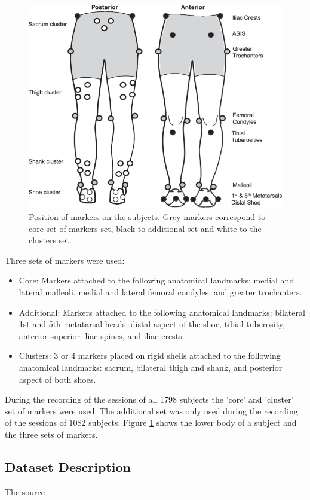 \begin{figure}[ht]
    \begin{centering}
    \includegraphics[width=0.5\columnwidth]{images/billateral_marker_position.png}
    \par\end{centering}
    \caption{Position of markers on the subjects. Grey markers correspond to core set of markers set, black to additional set and white to the clusters set.}
    \label{fig:marker_position}
\end{figure}

Three sets of markers were used:
\begin{itemize}
    \item Core: Markers attached to the following anatomical landmarks: medial and lateral malleoli, medial and lateral femoral condyles, and greater trochanters.
    \item Additional: Markers attached to the following anatomical landmarks: bilateral 1st and 5th metatarsal heads, distal aspect of the shoe, tibial tuberosity, anterior superior iliac spines, and iliac crests;
    \item Clusters: 3 or 4 markers placed on rigid shells attached to the following anatomical landmarks: sacrum, bilateral thigh and shank, and posterior aspect of both shoes.
\end{itemize}

During the recording of the sessions of all 1798 subjects the 'core' and 'cluster' set of markers were used. The additional set was only used during the recording of the sessions of 1082 subjects. Figure \ref{fig:marker_position} shows the lower body of a subject and the three sets of markers.


\subsection{Dataset Description}\label{subsec:method-dataset-description}
The source 



